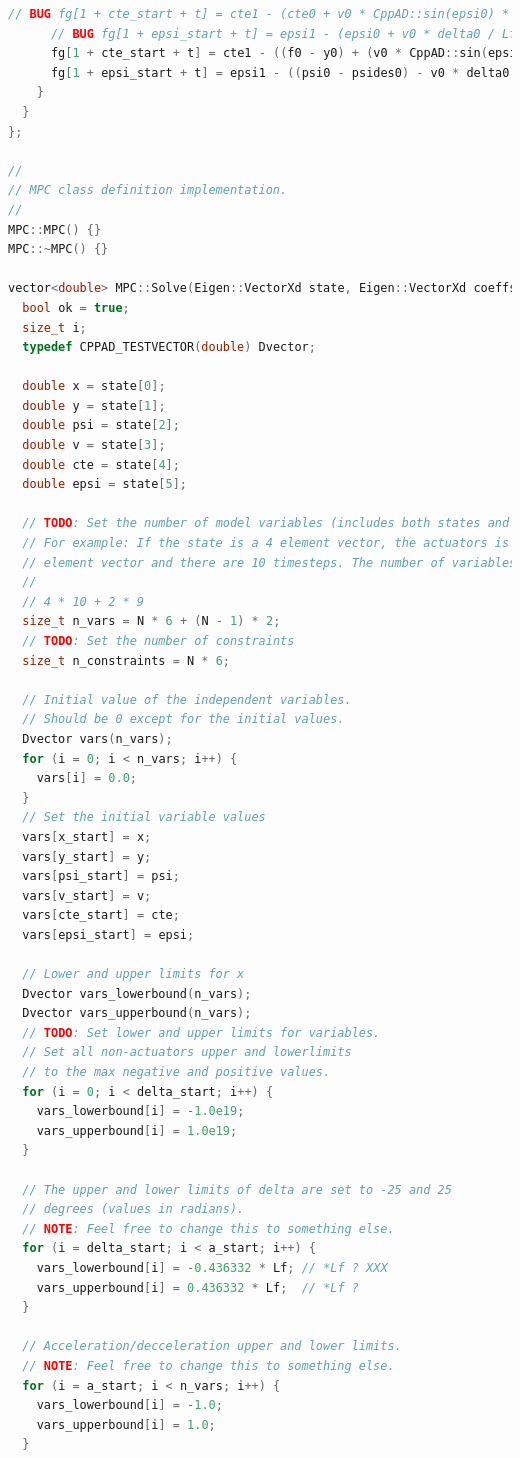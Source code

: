 \documentclass[11pt]{article}
\begin{document}
\begin{lstlisting}[language=C++, caption={MPC solver with ipopt}]
      // BUG fg[1 + cte_start + t] = cte1 - (cte0 + v0 * CppAD::sin(epsi0) * dt);
      // BUG fg[1 + epsi_start + t] = epsi1 - (epsi0 + v0 * delta0 / Lf * dt);
      fg[1 + cte_start + t] = cte1 - ((f0 - y0) + (v0 * CppAD::sin(epsi0) * dt));
      fg[1 + epsi_start + t] = epsi1 - ((psi0 - psides0) - v0 * delta0 / Lf * dt); // XXX + -> -
    }
  }
};

//
// MPC class definition implementation.
//
MPC::MPC() {}
MPC::~MPC() {}

vector<double> MPC::Solve(Eigen::VectorXd state, Eigen::VectorXd coeffs) {
  bool ok = true;
  size_t i;
  typedef CPPAD_TESTVECTOR(double) Dvector;

  double x = state[0];
  double y = state[1];
  double psi = state[2];
  double v = state[3];
  double cte = state[4];
  double epsi = state[5];

  // TODO: Set the number of model variables (includes both states and inputs).
  // For example: If the state is a 4 element vector, the actuators is a 2
  // element vector and there are 10 timesteps. The number of variables is:
  //
  // 4 * 10 + 2 * 9
  size_t n_vars = N * 6 + (N - 1) * 2;
  // TODO: Set the number of constraints
  size_t n_constraints = N * 6;

  // Initial value of the independent variables.
  // Should be 0 except for the initial values.
  Dvector vars(n_vars);
  for (i = 0; i < n_vars; i++) {
    vars[i] = 0.0;
  }
  // Set the initial variable values
  vars[x_start] = x;
  vars[y_start] = y;
  vars[psi_start] = psi;
  vars[v_start] = v;
  vars[cte_start] = cte;
  vars[epsi_start] = epsi;

  // Lower and upper limits for x
  Dvector vars_lowerbound(n_vars);
  Dvector vars_upperbound(n_vars);
  // TODO: Set lower and upper limits for variables.
  // Set all non-actuators upper and lowerlimits
  // to the max negative and positive values.
  for (i = 0; i < delta_start; i++) {
    vars_lowerbound[i] = -1.0e19;
    vars_upperbound[i] = 1.0e19;
  }

  // The upper and lower limits of delta are set to -25 and 25
  // degrees (values in radians).
  // NOTE: Feel free to change this to something else.
  for (i = delta_start; i < a_start; i++) {
    vars_lowerbound[i] = -0.436332 * Lf; // *Lf ? XXX
    vars_upperbound[i] = 0.436332 * Lf;  // *Lf ?
  }

  // Acceleration/decceleration upper and lower limits.
  // NOTE: Feel free to change this to something else.
  for (i = a_start; i < n_vars; i++) {
    vars_lowerbound[i] = -1.0;
    vars_upperbound[i] = 1.0;
  }



\end{lstlisting}
\end{document}
